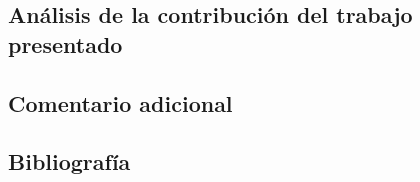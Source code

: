 \documentclass[
  american,
]{article}
\begin{document}
\hypertarget{anuxe1lisis-de-la-contribuciuxf3n-del-trabajo-presentado}{%
\subsection{Análisis de la contribución del trabajo
presentado}\label{anuxe1lisis-de-la-contribuciuxf3n-del-trabajo-presentado}}

\hypertarget{comentario-adicional}{%
\subsection{Comentario adicional}\label{comentario-adicional}}

\hypertarget{bibliografuxeda}{%
\subsection{Bibliografía}\label{bibliografuxeda}}

\printbibliography
\end{document}
